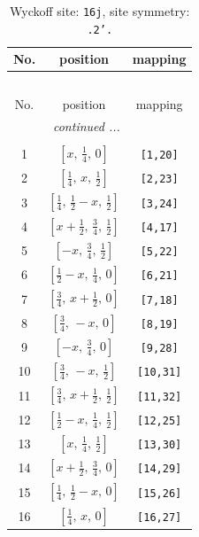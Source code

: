 \documentclass[fleqn,8pt]{jsarticle}
\begin{document}
\renewcommand{\arraystretch}{1.2}
\begin{longtable}{ccc}
\caption{Wyckoff site: {\tt 16j}, site symmetry: {\tt .2'.}}
 \\
 \hline \hline
No. & position & mapping \\ \hline \endfirsthead

\multicolumn{2}{l}{\tablename\ \thetable{}} \\
 \hline \hline
No. & position & mapping \\ \hline \endhead

 \hline \hline
\multicolumn{2}{r}{\footnotesize\it continued ...} \\ \endfoot

 \hline \hline
\multicolumn{2}{r}{} \\ \endlastfoot

1 & $\left[ x,\, \frac{1}{4},\, 0 \right]$ & {\tt [1,20]} \\ \hline
2 & $\left[ \frac{1}{4},\, x,\, \frac{1}{2} \right]$ & {\tt [2,23]} \\ \hline
3 & $\left[ \frac{1}{4},\, \frac{1}{2} - x,\, \frac{1}{2} \right]$ & {\tt [3,24]} \\ \hline
4 & $\left[ x + \frac{1}{2},\, \frac{3}{4},\, \frac{1}{2} \right]$ & {\tt [4,17]} \\ \hline
5 & $\left[ - x,\, \frac{3}{4},\, \frac{1}{2} \right]$ & {\tt [5,22]} \\ \hline
6 & $\left[ \frac{1}{2} - x,\, \frac{1}{4},\, 0 \right]$ & {\tt [6,21]} \\ \hline
7 & $\left[ \frac{3}{4},\, x + \frac{1}{2},\, 0 \right]$ & {\tt [7,18]} \\ \hline
8 & $\left[ \frac{3}{4},\, - x,\, 0 \right]$ & {\tt [8,19]} \\ \hline
9 & $\left[ - x,\, \frac{3}{4},\, 0 \right]$ & {\tt [9,28]} \\ \hline
10 & $\left[ \frac{3}{4},\, - x,\, \frac{1}{2} \right]$ & {\tt [10,31]} \\ \hline
11 & $\left[ \frac{3}{4},\, x + \frac{1}{2},\, \frac{1}{2} \right]$ & {\tt [11,32]} \\ \hline
12 & $\left[ \frac{1}{2} - x,\, \frac{1}{4},\, \frac{1}{2} \right]$ & {\tt [12,25]} \\ \hline
13 & $\left[ x,\, \frac{1}{4},\, \frac{1}{2} \right]$ & {\tt [13,30]} \\ \hline
14 & $\left[ x + \frac{1}{2},\, \frac{3}{4},\, 0 \right]$ & {\tt [14,29]} \\ \hline
15 & $\left[ \frac{1}{4},\, \frac{1}{2} - x,\, 0 \right]$ & {\tt [15,26]} \\ \hline
16 & $\left[ \frac{1}{4},\, x,\, 0 \right]$ & {\tt [16,27]} \\
\end{longtable}
\end{document}

